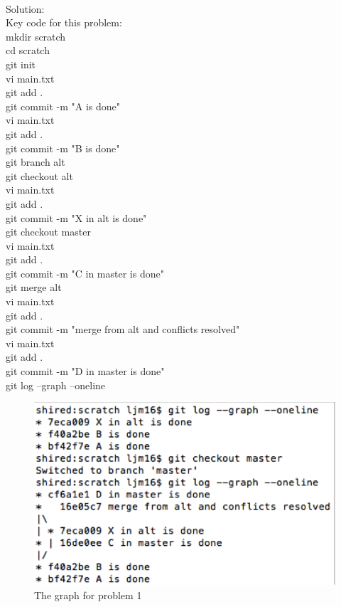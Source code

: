 \documentclass[12pt]{article}
\begin{document}
\noindent\ \\Solution:\\
Key code for this problem: \\
mkdir scratch \\
cd scratch\\
git init\\
vi main.txt\\
git add .\\
git commit -m "A is done"\\
vi main.txt\\
git add .\\
git commit -m "B is done"\\
git branch alt\\
git checkout alt\\
vi main.txt\\
git add .\\
git commit -m "X in alt is done"\\
git checkout master\\
vi main.txt\\
git add .\\
git commit -m "C in master is done"\\
git merge alt\\
vi main.txt\\
git add .\\
git commit -m "merge from alt and conflicts resolved"\\
vi main.txt\\
git add .\\
git commit -m "D in master is done"\\
git log --graph --oneline\\
\begin{figure}[h]
    \begin{center}
        \includegraphics[scale=0.6]{pro.png}
    \end{center}
    \caption{The graph for problem 1}
    \label{fig:branch}
\end{figure}
\end{document}
